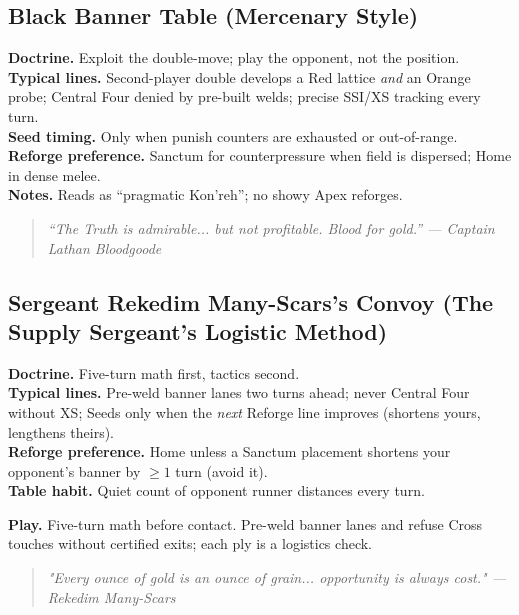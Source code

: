\documentclass[11pt]{article}
\providecommand{\playdesc}[1]{\par\smallskip\noindent\small\textbf{Play.} #1\par}
\begin{document}
\subsection*{Black Banner Table (Mercenary Style)}
\textbf{Doctrine.} Exploit the double-move; play the opponent, not the position.\\
\textbf{Typical lines.} Second-player double develops a Red lattice \emph{and} an Orange probe; Central Four denied by pre-built welds; precise SSI/XS tracking every turn.\\
\textbf{Seed timing.} Only when punish counters are exhausted or out-of-range.\\
\textbf{Reforge preference.} Sanctum for counterpressure when field is dispersed; Home in dense melee.\\
\textbf{Notes.} Reads as ``pragmatic Kon'reh''; no showy Apex reforges.
\begin{quote}\small\itshape
“The Truth is admirable... but not profitable. Blood for gold.” — Captain Lathan Bloodgoode
\end{quote}

\subsection*{Sergeant Rekedim Many-Scars’s Convoy (The Supply Sergeant's Logistic Method)}
\textbf{Doctrine.} Five-turn math first, tactics second.\\
\textbf{Typical lines.} Pre-weld banner lanes two turns ahead; never Central Four without XS; Seeds only when the \emph{next} Reforge line improves (shortens yours, lengthens theirs).\\
\textbf{Reforge preference.} Home unless a Sanctum placement shortens your opponent’s banner by $\geq1$ turn (avoid it).\\
\textbf{Table habit.} Quiet count of opponent runner distances every turn.
\playdesc{Five-turn math before contact. Pre-weld banner lanes and refuse Cross touches without certified exits; each ply is a logistics check.}
\begin{quote}\small\itshape
"Every ounce of gold is an ounce of grain... opportunity is always cost." — Rekedim Many-Scars
\end{quote}

\end{document}
